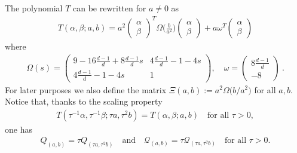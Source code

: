 \documentclass[reqno]{amsart}
\begin{document}
The polynomial $T$ can be rewritten for $a\neq 0$ as
\begin{align*}  
  T(\alpha,\beta;a,b)
  = a^2\begin{pmatrix} \alpha\\ \beta \end{pmatrix}^T\Omega\Big(\frac{b}{a^2}\Big)\begin{pmatrix} \alpha\\ \beta \end{pmatrix}
  + a\omega^T\begin{pmatrix} \alpha\\ \beta \end{pmatrix}
\end{align*}
where
\begin{align*}
  \Omega(s) =
  \begin{pmatrix}
    9-16\frac{d-1}d+8\frac{d-1}ds & 4\frac{d-1}d-1-4s \\[2mm]
    4\frac{d-1}d-1-4s & 1
  \end{pmatrix},
                        \quad
                        \omega = 
                   \begin{pmatrix}
                     8\frac{d-1}d \\[2mm] -8
                   \end{pmatrix} \ .
\end{align*}
For later purposes we also define the matrix $\Xi(a,b):=a^2 \Omega\big(b/a^2\big)$  for all $a,b$. Notice that, thanks to the scaling property 
\begin{align*}
  T(\tau^{-1}\alpha,\tau^{-1}\beta;\tau a,\tau^2b)=T(\alpha,\beta;a,b)
  \quad \text{for all $\tau>0$},
\end{align*}
one has
\begin{align}
  \label{eq:Qscaling}
  Q_{(a,b)} = \tau Q_{(\tau a,\tau^2b)}
  \quad \text{and} \quad
  \mathcal Q_{(a,b)} = \tau\mathcal Q_{(\tau a,\tau^2b)}
  \quad \text{for all $\tau>0$}.
\end{align}
%
\medskip
\end{document}
